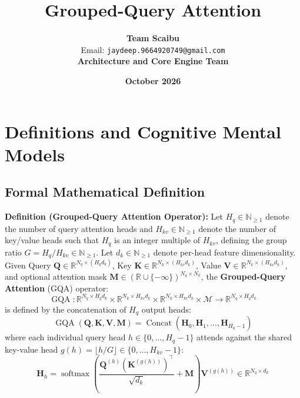 \documentclass[11pt,a4paper]{article}
\title{\textbf{Grouped-Query Attention}}
\author{\textbf{Team Scaibu} \\ \small Email: \texttt{jaydeep.9664920749@gmail.com} \\ \small \textbf{Architecture and Core Engine Team}}
\date{\textbf{October 2026}}
\theoremstyle{definition}
\begin{document}
\maketitle

\section{Definitions and Cognitive Mental Models}

\subsection{Formal Mathematical Definition}
\textbf{Definition (Grouped-Query Attention Operator):}
Let $H_q \in \mathbb{N}_{\ge 1}$ denote the number of query attention heads and $H_{kv} \in \mathbb{N}_{\ge 1}$ denote the number of key/value heads such that $H_q$ is an integer multiple of $H_{kv}$, defining the group ratio $G = H_q / H_{kv} \in \mathbb{N}_{\ge 1}$. Let $d_k \in \mathbb{N}_{\ge 1}$ denote per-head feature dimensionality.
Given Query $\mathbf{Q} \in \mathbb{R}^{N_q \times (H_q d_k)}$, Key $\mathbf{K} \in \mathbb{R}^{N_k \times (H_{kv} d_k)}$, Value $\mathbf{V} \in \mathbb{R}^{N_k \times (H_{kv} d_k)}$, and optional attention mask $\mathbf{M} \in (\mathbb{R} \cup \{-\infty\})^{N_q \times N_k}$, the \textbf{Grouped-Query Attention} (GQA) operator:
{\boldmath
\begin{equation}
\operatorname{GQA}: \mathbb{R}^{N_q \times H_q d_k} \times \mathbb{R}^{N_k \times H_{kv} d_k} \times \mathbb{R}^{N_k \times H_{kv} d_k} \times \mathcal{M} \longrightarrow \mathbb{R}^{N_q \times H_q d_k}
\end{equation}
}
is defined by the concatenation of $H_q$ output heads:
{\boldmath
\begin{equation}
\operatorname{GQA}(\mathbf{Q}, \mathbf{K}, \mathbf{V}, \mathbf{M}) = \operatorname{Concat}\left(\mathbf{H}_0, \mathbf{H}_1, \dots, \mathbf{H}_{H_q - 1}\right)
\end{equation}
}
where each individual query head $h \in \{0, \dots, H_q - 1\}$ attends against the shared key-value head $g(h) = \lfloor h / G \rfloor \in \{0, \dots, H_{kv} - 1\}$:
{\boldmath
\begin{equation}
\mathbf{H}_h = \operatorname{softmax}\left(\frac{\mathbf{Q}^{(h)} (\mathbf{K}^{(g(h))})^\top}{\sqrt{d_k}} + \mathbf{M}\right)\mathbf{V}^{(g(h))} \in \mathbb{R}^{N_q \times d_k}
\end{equation}
}
\end{document}
